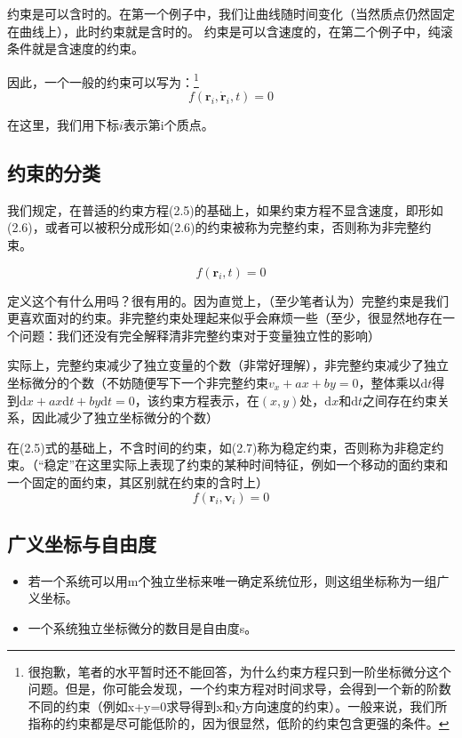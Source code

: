 \documentclass[a4paper, 10pt, openany]{book}%
\begin{document}
约束是可以含时的。在第一个例子中，我们让曲线随时间变化（当然质点仍然固定在曲线上），此时约束就是含时的。
约束是可以含速度的，在第二个例子中，纯滚条件就是含速度的约束。

因此，一个一般的约束可以写为：\footnote{很抱歉，笔者的水平暂时还不能回答，为什么约束方程只到一阶坐标微分这个问题。但是，你可能会发现，一个约束方程对时间求导，会得到一个新的阶数不同的约束（例如x+y=0求导得到x和y方向速度的约束）。一般来说，我们所指称的约束都是尽可能低阶的，因为很显然，低阶的约束包含更强的条件。}
\begin{equation}
  f(\textbf{r}_i,\dot{\textbf{r}}_i,t)=0
\end{equation}

在这里，我们用下标$i$表示第i个质点。

  
  \subsection{约束的分类}
  我们规定，在普适的约束方程(2.5)的基础上，如果约束方程不显含速度，即形如(2.6)，或者可以被积分成形如(2.6)的约束被称为完整约束，否则称为非完整约束。
  
  \begin{equation}
    f(\textbf{r}_i,t)=0
  \end{equation}

  定义这个有什么用吗？很有用的。因为直觉上，（至少笔者认为）完整约束是我们更喜欢面对的约束。非完整约束处理起来似乎会麻烦一些（至少，很显然地存在一个问题：我们还没有完全解释清非完整约束对于变量独立性的影响）

  实际上，完整约束减少了独立变量的个数（非常好理解），非完整约束减少了独立坐标微分的个数（不妨随便写下一个非完整约束$v_x+ax+by=0$，整体乘以$\mathrm{d}t$得到$\mathrm{d}x+ax\mathrm{d}t+by\mathrm{d}t=0$，该约束方程表示，在$(x,y)$处，$\mathrm{d}x$和$\mathrm{d}t$之间存在约束关系，因此减少了独立坐标微分的个数）
  
  在(2.5)式的基础上，不含时间的约束，如(2.7)称为稳定约束，否则称为非稳定约束。（“稳定”在这里实际上表现了约束的某种时间特征，例如一个移动的面约束和一个固定的面约束，其区别就在约束的含时上）
  \begin{equation}
    f(\textbf{r}_i,\textbf{v}_i)=0
  \end{equation}
  \subsection{广义坐标与自由度}
  \begin{itemize}
  \item 若一个系统可以用m个独立坐标来唯一确定系统位形，则这组坐标称为一组广义坐标。

  \item 一个系统独立坐标微分的数目是自由度s。
  \end{itemize}
   
\end{document}
